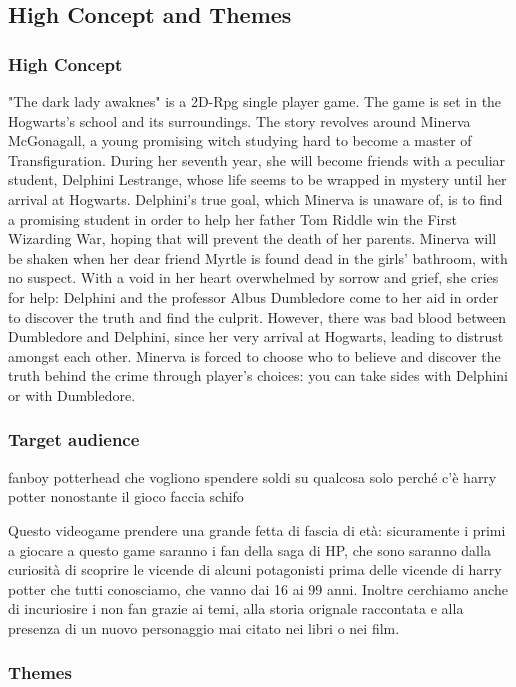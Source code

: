 \subsection{High Concept and Themes}

\subsubsection{High Concept}

"The dark lady awaknes" is a 2D-Rpg single player game. The game is set in the Hogwarts's school and its surroundings. The story revolves around Minerva McGonagall, a young promising witch studying hard to become a master of Transfiguration. During her seventh year, she will become friends with a peculiar student, Delphini Lestrange, whose life seems to be wrapped in mystery until her arrival at Hogwarts. Delphini's true goal, which Minerva is unaware of, is to find a promising student in order to help her father Tom Riddle win the First Wizarding War, hoping that will prevent the death of her parents.
Minerva will be shaken when her dear friend Myrtle is found dead in the girls' bathroom, with no suspect. With a void in her heart overwhelmed by sorrow and grief, she cries for help: Delphini and the professor Albus Dumbledore come to her aid in order to discover the truth and find the culprit. However, there was bad blood between Dumbledore and Delphini, since her very arrival at Hogwarts, leading to distrust amongst each other.
Minerva is forced to choose who to believe and discover the truth behind the crime through player's choices: you can take sides with Delphini or with Dumbledore.

\subsubsection{Target audience}
fanboy potterhead che vogliono spendere soldi su qualcosa solo perché c'è harry potter nonostante il gioco faccia schifo

Questo videogame prendere una grande fetta di fascia di età: sicuramente i primi a giocare a questo game saranno i fan della saga di HP, che sono saranno dalla curiosità di scoprire le vicende di alcuni potagonisti prima delle vicende di harry potter che tutti conosciamo, che vanno dai 16 ai 99 anni. Inoltre cerchiamo anche di incuriosire i non fan grazie ai temi, alla storia orignale raccontata e alla presenza di un nuovo personaggio mai citato nei libri o nei film.
\pagebreak
\subsubsection{Themes}


